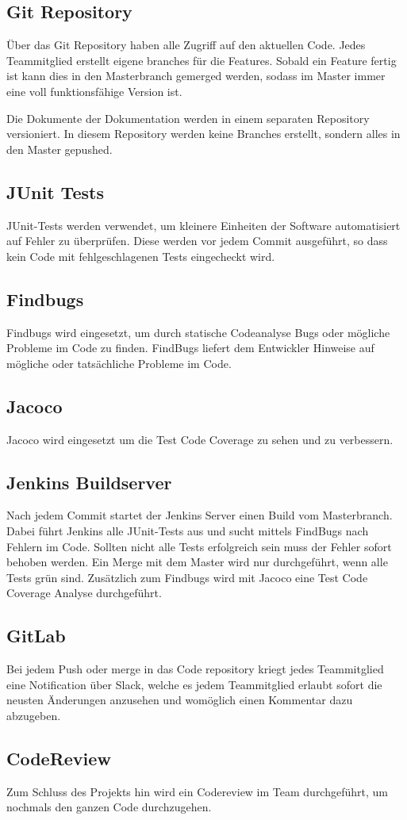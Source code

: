 \documentclass[11pt]{scrartcl}
\begin{document}
\subsection{Git Repository}
Über das Git Repository haben alle Zugriff auf den aktuellen Code.
Jedes Teammitglied erstellt eigene branches für die Features.
Sobald ein Feature fertig ist kann dies in den Masterbranch gemerged werden, 
sodass im Master immer eine voll funktionsfähige Version  ist.

Die Dokumente der Dokumentation werden in einem separaten 
Repository versioniert. In diesem Repository werden keine Branches 
erstellt, sondern alles in den Master gepushed.
\subsection{JUnit Tests}
JUnit-Tests werden verwendet, um kleinere Einheiten der Software 
automatisiert auf Fehler zu überprüfen. Diese werden vor jedem Commit ausgeführt, 
so dass kein Code mit fehlgeschlagenen Tests eingecheckt wird.
\subsection{Findbugs}
Findbugs wird eingesetzt, um durch statische Codeanalyse Bugs 
oder mögliche Probleme im Code zu finden. FindBugs liefert dem Entwickler 
Hinweise auf mögliche oder tatsächliche Probleme im Code.
\subsection{Jacoco}
Jacoco wird eingesetzt um die Test Code Coverage zu sehen und zu verbessern.
\subsection{Jenkins Buildserver}
Nach jedem Commit startet der Jenkins Server einen Build vom Masterbranch. 
Dabei führt Jenkins alle JUnit-Tests aus und sucht mittels FindBugs nach
 Fehlern im Code. Sollten nicht alle Tests erfolgreich sein muss der 
 Fehler sofort behoben werden. Ein Merge mit dem Master wird nur durchgeführt, 
 wenn alle Tests grün sind.
 Zusätzlich zum Findbugs wird mit Jacoco eine Test Code Coverage Analyse 
 durchgeführt.
 \subsection{GitLab}
 Bei jedem Push oder merge in das Code repository kriegt jedes Teammitglied eine 
 Notification über Slack, welche es jedem Teammitglied erlaubt sofort die 
 neusten Änderungen anzusehen und womöglich einen Kommentar dazu abzugeben.
\subsection{CodeReview}
Zum Schluss des Projekts hin wird ein Codereview im Team durchgeführt, um 
nochmals den ganzen Code durchzugehen.
\end{document}
